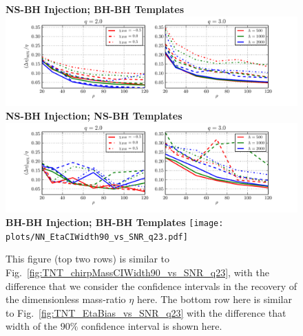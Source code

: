 \documentclass[aps,prd,amsmath,floats,floatfix, twocolumn,
superscriptaddress,nofootinbib,showpacs]{revtex4-1}
\begin{document}
\begin{figure}
\centering    
\textbf{NS-BH Injection; BH-BH Templates}
\includegraphics[width=1.7\columnwidth]{plots/TN_EtaCIWidth90_vs_SNR_q23.pdf}\\ 
\textbf{NS-BH Injection; NS-BH Templates}
\includegraphics[width=1.7\columnwidth]{plots/TT_EtaCIWidth90_vs_SNR_q23.pdf}\\%
\textbf{BH-BH Injection; BH-BH Templates}
\texttt{[image: plots/NN\_EtaCIWidth90\_vs\_SNR\_q23.pdf]} 
\caption{This figure (top two rows) is similar to Fig.~\ref{fig:TNT_chirpMassCIWidth90_vs_SNR_q23},
  with the difference that we consider the confidence intervals in the recovery
  of the dimensionless mass-ratio $\eta$ here. The bottom row here is similar to 
  Fig.~\ref{fig:TNT_EtaBias_vs_SNR_q23} with the difference that width of the $90\%$
  confidence interval is shown here.}
\label{fig:TNT_EtaCIWidth90_vs_SNR_q23}
\end{figure}
% 
\end{document}
